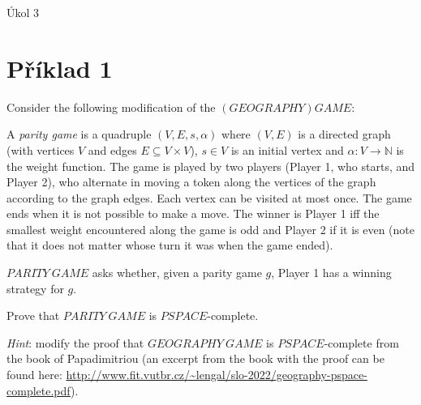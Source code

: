\documentclass[a4paper, 11pt, fleqn]{scrartcl}
\newcommand{\NAZEV}{Úkol 3}
\begin{document}
 \begin{center}
   {\Large \NAZEV}
 \end{center}


  \section*{Příklad 1}
    Consider the following modification of the $\mathit{(GEOGRAPHY) GAME}$:

    \vspace{0.2cm}

    \begin{adjustwidth}{2em}{2em}
      A \textit{parity game} is a quadruple $(V, E, s, \alpha)$ where $(V, E)$ is a directed graph (with vertices $V$ and edges $E \subseteq V \times V$), $s \in V$ is an initial vertex and $\alpha : V \rightarrow \mathbb{N}$ is the weight function. The game is played by two players (Player 1, who starts, and Player 2), who alternate in moving a token along the vertices of the graph according to the graph edges. Each vertex can be visited at most once. The game ends when it is not possible to make a move. The winner is Player 1 iff the smallest weight encountered along the game is odd and Player 2 if it is even (note that it does not matter whose turn it was when the game ended).
    \end{adjustwidth}

    \vspace{0.2cm}

    $\mathit{PARITY~GAME}$ asks whether, given a parity game $g$, Player 1 has a winning strategy for $g$.

    Prove that $\mathit{PARITY~GAME}$ is \footnotesize$\mathit{PSPACE}$\normalsize-complete.

    \vspace{0.2cm}

    \textit{Hint}: modify the proof that $\mathit{GEOGRAPHY~GAME}$ is \footnotesize$\mathit{PSPACE}$\normalsize-complete from the book of Papadimitriou (an excerpt from the book with the proof can be found here: \url{http://www.fit.vutbr.cz/~lengal/slo-2022/geography-pspace-complete.pdf}).
\end{document}

